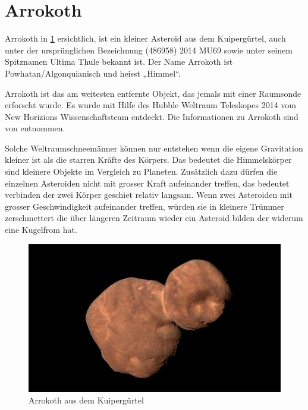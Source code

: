 %
%
%
%
\section{Arrokoth
\label{planet:section:arrokoth}}

Arrokoth in \cref{planet:fig:arrokoth} ersichtlich, ist ein kleiner Asteroid aus dem Kuipergürtel, auch unter der ursprünglichen Bezeichnung (486958) 2014 MU69 sowie unter seinem Spitznamen Ultima Thule bekannt ist.
Der Name Arrokoth ist Powhatan/Algonquianisch und heisst „Himmel“.

Arrokoth ist das am weitesten entfernte Objekt, das jemals mit einer Raumsonde erforscht wurde.
Es wurde mit Hilfe des Hubble Weltraum Teleskopes 2014 vom New Horizions Wissenschaftsteam entdeckt.
Die Informationen zu Arrokoth sind von \cite{planet:arrokoth} entnommen.

Solche Weltraumschneemänner können nur entstehen wenn die eigene Gravitation kleiner ist als die starren Kräfte des Körpers.
Das bedeutet die Himmelskörper sind kleinere Objekte im Vergleich zu Planeten.
Zusätzlich dazu dürfen die einzelnen Asteroiden nicht mit grosser Kraft aufeinander treffen, das bedeutet verbinden der zwei Körper geschiet relativ langsam.
Wenn zwei Asteroiden mit grosser Geschwindigkeit aufeinander treffen, würden sie in kleinere Trümmer zerschmettert die über längeren Zeitraum wieder ein Asteroid bilden der widerum eine Kugelfrom hat.

\begin{figure}[h]
    \centering
    \includegraphics[width=\linewidth]{papers/planet/pictures/Arrokoth.pdf}
    \caption{Arrokoth aus dem Kuipergürtel
        \label{planet:fig:arrokoth}}
\end{figure}